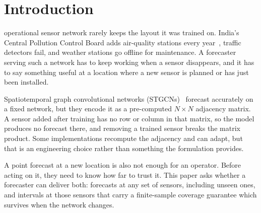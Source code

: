 \documentclass[journal,twoside,web]{ieeecolor}
\begin{document}
\maketitle

\section{Introduction}
\label{sec:introduction}

 operational sensor network rarely keeps the layout it was trained on. India's
Central Pollution Control Board adds air-quality stations every year~\cite{panja2026estgcn}, traffic
detectors fail, and weather stations go offline for maintenance. A forecaster serving such a network
has to keep working when a sensor disappears, and it has to say something useful at a location where
a new sensor is planned or has just been installed.

Spatiotemporal graph convolutional networks (STGCNs)~\cite{yu2018stgcn} forecast accurately on a
fixed network, but they encode it as a pre-computed $N\times N$ adjacency matrix. A sensor added after
training has no row or column in that matrix, so the model produces no forecast there, and removing a
trained sensor breaks the matrix product. Some implementations recompute the adjacency and can adapt,
but that is an engineering choice rather than something the formulation provides.

A point forecast at a new location is also not enough for an operator. Before acting on it, they need
to know how far to trust it. This paper asks whether a forecaster can deliver both: forecasts at any
set of sensors, including unseen ones, and intervals at those sensors that carry a finite-sample
coverage guarantee which survives when the network changes.
\end{document}

